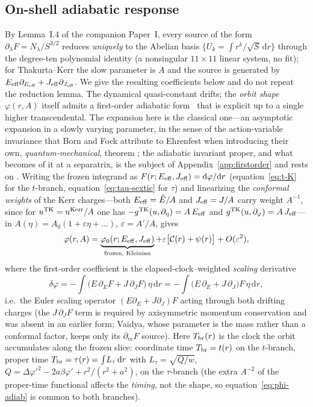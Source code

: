 \documentclass[12pt]{iopart}
\theoremstyle{plain}
\theoremstyle{definition}
\theoremstyle{remark}
\newcommand{\Ehat}{\hat E}
\newcommand{\dd}{\mathrm{d}}
\begin{document}
\subsection{On-shell adiabatic response}
\label{sec:adiabatic}
By Lemma~I.4 of the companion Paper~I, every source of the form
$\partial_\lambda F=N_\lambda/S^{3/2}$ reduces \emph{uniquely} to the Abelian basis
$\{U_k=\int r^k/\sqrt S\,\dd r\}$ through the degree-ten polynomial identity (a
nonsingular $11\times11$ linear system, no fit); for Thakurta--Kerr the slow parameter is
$A$ and the source is generated by $E_{\rm eff}\partial_{E_{\rm eff}}+J_{\rm
eff}\partial_{J_{\rm eff}}$. We give the resulting coefficients below and do not repeat
the reduction lemma. The dynamical quasi-constant drifts; the
\emph{orbit shape} $\varphi(r,A)$ itself admits a first-order adiabatic
form~\cite{BenderOrszag1999} that is explicit up to a single higher
transcendental. The expansion here is the classical one---an asymptotic expansion
in a slowly varying parameter, in the sense of the action-variable invariance that
Born and Fock attribute to Ehrenfest when introducing their own,
\emph{quantum-mechanical}, theorem \cite[p.~165]{BornFock1928}; the adiabatic
invariant proper, and what becomes of it at a separatrix, is the subject of
Appendix~\ref{app:firstorder} and rests on
\cite{Timofeev1978,CaryEscandeTennyson1986,Neishtadt1986}. Writing the frozen integrand as
$F(r;E_{\rm eff},J_{\rm eff})=\dd\varphi/\dd r$ (equation~\eqref{eq:t-K} for the
$t$-branch, equation~\eqref{eq:tau-sextic} for $\tau$) and linearizing the
\emph{conformal weights} of the Kerr charges---both $E_{\rm eff}=\Ehat/A$ and
$J_{\rm eff}=J/A$ carry weight $A^{-1}$, since for $u^{\rm TK}=u^{\rm Kerr}/A$ one
has $-g^{\rm TK}(u,\partial_\eta)=A\,E_{\rm eff}$ and
$g^{\rm TK}(u,\partial_\varphi)=A\,J_{\rm eff}$---in
$A(\eta)=A_0(1+\varepsilon\eta+\dots)$, $\varepsilon=A'/A$, gives
\begin{equation}
    \varphi(r,A)=\underbrace{\varphi_0(r;E_{\rm eff},J_{\rm eff})}_{\text{frozen, Kleinian}}
    +\varepsilon\big[\mathcal{C}(r)+\psi(r)\big]+O(\varepsilon^2),
    \label{eq:phi-adiab}
\end{equation}
where the first-order coefficient is the elapsed-clock--weighted \emph{scaling}
derivative
\begin{equation}
    \delta\varphi=-\!\int\!\big(\Ehat\,\partial_E F+J\,\partial_J F\big)\,\eta\,\dd r
    =-\!\int\!\big(E\,\partial_E+J\,\partial_J\big)F\,\eta\,\dd r,
    \label{eq:deltaphi-EJ}
\end{equation}
i.e.\ the Euler scaling operator $(E\partial_E+J\partial_J)F$ acting through both
drifting charges (the $J\,\partial_J F$ term is required by axisymmetric momentum
conservation and was absent in an earlier form; Vaidya, whose parameter is the
mass rather than a conformal factor, keeps only its $\partial_m F$ source). Here
$T_{\rm br}(r)$
is the clock the orbit accumulates along the frozen slice: coordinate time
$T_{\rm br}=t(r)$ on the $t$-branch, proper time $T_{\rm br}=\tau(r)=\int\!L_\tau\,\dd r$ with
$L_\tau=\sqrt{Q/w}$, $Q=\Delta\varphi'^2-2a\beta\varphi'+r^2/(r^2+a^2)$, on the
$\tau$-branch (the extra $A^{-2}$ of the proper-time functional affects the
\emph{timing}, not the shape, so equation~\eqref{eq:phi-adiab} is common to both
branches).
\end{document}
